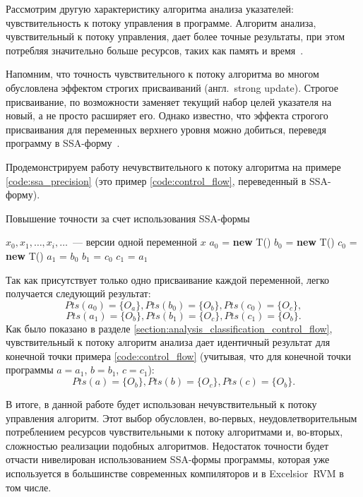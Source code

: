 \documentclass[14pt,titlepage]{extarticle}
\newcommand{\NEW}{\textbf{new }}
\newcommand{\eng}[1]{{\English#1}}
\newcommand{\engdef}[1]{(англ.~\eng{#1})}
\begin{document}
        Рассмотрим другую характеристику алгоритма анализа указателей:
        чувствительность к потоку управления в программе.
        Алгоритм анализа, чувствительный к потоку управления, дает более точные
        результаты, при этом потребляя значительно больше ресурсов, таких как
        память и
        время~\cite[раздел.~4.4]{hind_pointer_analysis_not_solved_yet}.

        Напомним, что точность чувствительного к потоку алгоритма во многом
        обусловлена эффектом строгих присваиваний \engdef{strong update}.
        Строгое присваивание, по возможности заменяет текущий набор целей
        указателя на новый, а не просто расширяет его.
        Однако известно, что эффекта строгого присваивания для переменных
        верхнего уровня можно добиться, переведя программу в
        SSA-форму~\cite{points_to_with_efficient_strong_updates}.

        Продемонстрируем работу нечувствительного к потоку алгоритма на примере
        \ref{code:ssa_precision} (это пример \ref{code:control_flow},
        переведенный в SSA-форму).
        \begin{algorithm}
          \caption{Повышение точности за счет использования SSA-формы}
          \label{code:ssa_precision}
          \begin{algorithmic}[1]
            \REQUIRE $x_0, x_1, \ldots, x_i, \ldots$~--- версии одной переменной $x$
            \STATE $a_0$ = \NEW T()
            \STATE $b_0$ = \NEW T()
            \STATE $c_0$ = \NEW T()
            \STATE $a_1$ = $b_0$
            \STATE $b_1$ = $c_0$
            \STATE $c_1$ = $a_1$
          \end{algorithmic}
        \end{algorithm}

        Так как присутствует только одно присваивание каждой переменной, легко
        получается следующий результат:
        \[Pts(a_0) = \{O_a\}, Pts(b_0) = \{O_b\}, Pts(c_0) = \{O_c\},\]
        \[Pts(a_1) = \{O_b\}, Pts(b_1) = \{O_c\}, Pts(c_1) = \{O_b\}.\]
        Как было показано в разделе
        \ref{section:analysis_classification_control_flow},
        чувствительный к
        потоку алгоритм анализа дает идентичный результат для конечной точки
        примера \ref{code:control_flow} (учитывая, что для конечной точки
        программы $a = a_1$, $b = b_1$, $c = c_1$):
        \[Pts(a) = \{O_b\}, Pts(b) = \{O_c\}, Pts(c) = \{O_b\}.\]

        В итоге, в данной работе будет использован нечувствительный к потоку
        управления алгоритм. Этот выбор обусловлен, во-первых,
        неудовлетворительным потреблением ресурсов чувствительными к потоку
        алгоритмами и, во-вторых, сложностью реализации подобных алгоритмов.
        Недостаток точности будет отчасти нивелирован использованием SSA-формы
        программы, которая уже используется в большинстве современных
        компиляторов и в \eng{Excelsior~RVM} в том числе.
\end{document}
